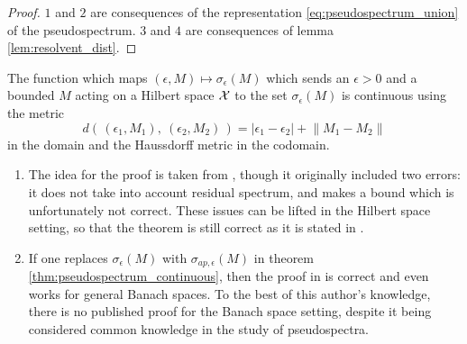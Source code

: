 \begin{proof}
    $1$ and $2$ are consequences of the representation \ref{eq:pseudospectrum_union} of 
    the pseudospectrum. $3$ and $4$ are consequences of lemma \ref{lem:resolvent_dist}. 
\end{proof}

\begin{theorem}
    \label{thm:pseudospectrum_continuous}
    The function which maps $(\epsilon, M) \mapsto \sigma_\epsilon (M)$ which sends an 
    $\epsilon > 0$ and a bounded $M$ acting on a Hilbert space $\mathcal{X}$ to the set 
    $\sigma_\epsilon (M)$ is continuous using the metric 
    \begin{equation}
        d(\, (\epsilon_1, M_1),\ (\epsilon_2, M_2) \,) 
        = | \epsilon_1 - \epsilon_2 | + \left\| M_1 - M_2 \right\|
    \end{equation}
    in the domain and the Haussdorff metric in the codomain. 
\end{theorem}

\begin{remark}
    \begin{enumerate}
        \item The idea for the proof is taken from
        \cite{pseudospectrum_continuous}, though it originally included two
        errors: it does not take into account residual spectrum, and makes a
        bound which is unfortunately not correct. These issues can be lifted in
        the Hilbert space setting, so that the theorem is still correct as it is
        stated in \cite{pseudospectrum_continuous}. 
        \item If one replaces $\sigma_\epsilon (M)$ with $\sigma_{ap, \epsilon}
        (M)$ in theorem \ref{thm:pseudospectrum_continuous}, then the proof in
        \cite{pseudospectrum_continuous} is correct and even works for general
        Banach spaces. To the best of this author's knowledge, there is no
        published proof for the Banach space setting, despite it being
        considered common knowledge in the study of pseudospectra. 
    \end{enumerate}
\end{remark}

